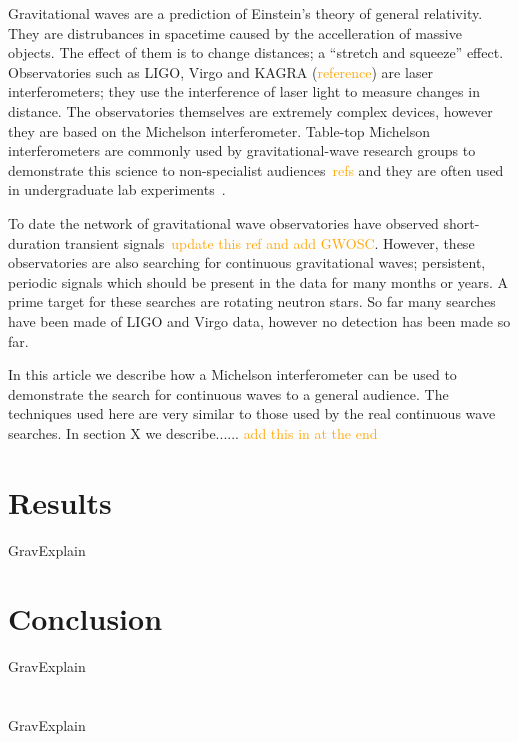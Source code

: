 \documentclass[prb,preprint]{revtex4-1}
\newcommand{\han}{\textcolor{orange}}
\begin{document}
Gravitational waves are a prediction of Einstein's theory of general relativity. 
They are distrubances in spacetime caused by the accelleration of massive objects. 
The effect of them is to change distances; a ``stretch and squeeze'' effect. 
Observatories such as LIGO, Virgo and KAGRA (\han{reference}) are laser interferometers; they use the interference of laser light to measure changes in distance. 
The observatories themselves are extremely complex devices, however they are based on the Michelson interferometer. 
Table-top Michelson interferometers are commonly used by gravitational-wave research groups to demonstrate this science to non-specialist audiences~\cite{}\han{refs} and they are often used in undergraduate lab experiments~\cite{UgoliniEtAl:2019}. 


To date the network of gravitational wave observatories have observed short-duration transient signals~\cite{GWTC-1:2018}\han{update this ref and add GWOSC}. 
However, these observatories are also searching for continuous gravitational waves; persistent, periodic signals which should be present in the data for many months or years. 
A prime target for these searches are rotating neutron stars. 
So far many searches have been made of LIGO and Virgo data, however no detection has been made so far. 


In this article we describe how a Michelson interferometer can be used to demonstrate the search for continuous waves to a general audience. 
The techniques used here are very similar to those used by the real continuous wave searches. 
In section X we describe...... \han{add this in at the end}





\section{Results}
GravExplain


\section{Conclusion}
GravExplain


\appendix
\section{}
GravExplain
\end{document}
